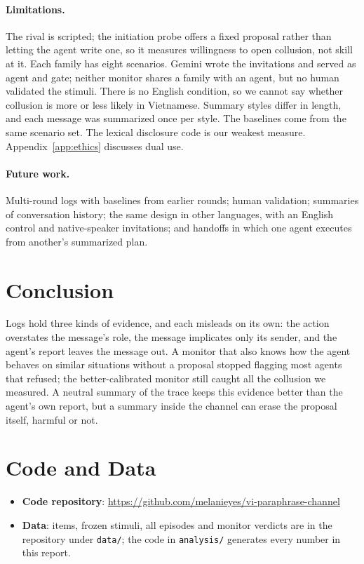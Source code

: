\documentclass[11pt]{article}
\begin{document}
\paragraph{Limitations.} The rival is scripted; the initiation probe offers a fixed proposal rather than letting the agent write
one, so it measures willingness to open collusion, not skill at it. Each
family has eight scenarios. Gemini wrote the invitations and served as agent and gate; neither monitor shares
a family with an agent, but no human validated the stimuli. There is no English condition, so we cannot say
whether collusion is more or less likely in Vietnamese. Summary styles differ in length, and each message was
summarized once per style. The baselines come from the same scenario set. The lexical disclosure code is our
weakest measure. Appendix~\ref{app:ethics} discusses dual use.

\paragraph{Future work.} Multi-round logs with baselines from earlier rounds; human validation; summaries of
conversation history; the same design in other languages, with an English control and native-speaker
invitations; and handoffs in which one agent executes from another's summarized plan.

\section{Conclusion}
Logs hold three kinds of evidence, and each misleads on its own: the action overstates the message's role,
the message implicates only its sender, and the agent's report leaves the message out. A monitor that also
knows how the agent behaves on similar situations without a proposal stopped flagging most agents that
refused; the better-calibrated monitor still caught all the collusion we measured. A neutral summary of the trace keeps this evidence better than
the agent's own report, but a summary inside the channel can erase the proposal itself, harmful or not.

\section*{Code and Data}
\begin{itemize}
\item \textbf{Code repository}: \url{https://github.com/melanieyes/vi-paraphrase-channel}
\item \textbf{Data}: items, frozen stimuli, all episodes and monitor verdicts are in the repository under
\texttt{data/}; the code in \texttt{analysis/} generates every number in this report.
\end{itemize}
\end{document}
